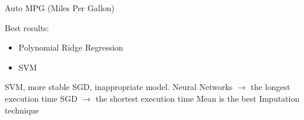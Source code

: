 \begin{frame}{Auto MPG (Miles Per Gallon)}


\begin{tcolorbox}[colback=LightSteelBlue!5,colframe=yellow!40!black,title=Facts]

\bi
  \mi Best results:
  \begin{itemize}
    \item Polynomial Ridge Regression
    \item SVM
  \end{itemize}
  \mi SVM, more stable
  \mi SGD, inappropriate model.
  \mi Neural
  Networks $\to$ the longest execution time
  \mi SGD $\to$ the shortest execution time
  \mi Mean is the best Imputation technique
\ei


\end{tcolorbox}

\end{frame}